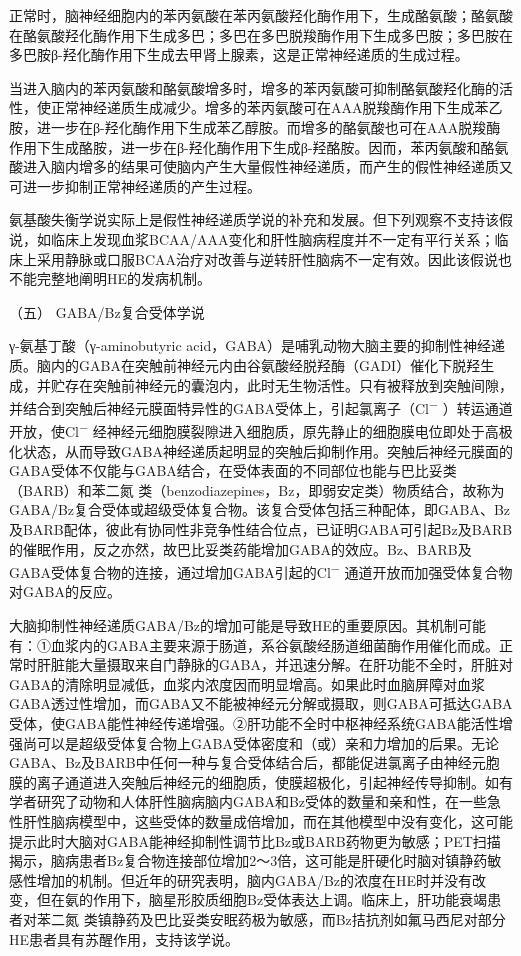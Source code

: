 正常时，脑神经细胞内的苯丙氨酸在苯丙氨酸羟化酶作用下，生成酪氨酸；酪氨酸在酪氨酸羟化酶作用下生成多巴；多巴在多巴脱羧酶作用下生成多巴胺；多巴胺在多巴胺β-羟化酶作用下生成去甲肾上腺素，这是正常神经递质的生成过程。

当进入脑内的苯丙氨酸和酪氨酸增多时，增多的苯丙氨酸可抑制酪氨酸羟化酶的活性，使正常神经递质生成减少。增多的苯丙氨酸可在AAA脱羧酶作用下生成苯乙胺，进一步在β-羟化酶作用下生成苯乙醇胺。而增多的酪氨酸也可在AAA脱羧酶作用下生成酪胺，进一步在β-羟化酶作用下生成β-羟酪胺。因而，苯丙氨酸和酪氨酸进入脑内增多的结果可使脑内产生大量假性神经递质，而产生的假性神经递质又可进一步抑制正常神经递质的产生过程。

氨基酸失衡学说实际上是假性神经递质学说的补充和发展。但下列观察不支持该假说，如临床上发现血浆BCAA/AAA变化和肝性脑病程度并不一定有平行关系；临床上采用静脉或口服BCAA治疗对改善与逆转肝性脑病不一定有效。因此该假说也不能完整地阐明HE的发病机制。

\hypertarget{text00101.htmlux5cux23CHP4-3-4-2-5}{}
（五） GABA/Bz复合受体学说

γ-氨基丁酸（γ-aminobutyric
acid，GABA）是哺乳动物大脑主要的抑制性神经递质。脑内的GABA在突触前神经元内由谷氨酸经脱羟酶（GADI）催化下脱羟生成，并贮存在突触前神经元的囊泡内，此时无生物活性。只有被释放到突触间隙，并结合到突触后神经元膜面特异性的GABA受体上，引起氯离子（Cl\textsuperscript{−}
）转运通道开放，使Cl\textsuperscript{−}
经神经元细胞膜裂隙进入细胞质，原先静止的细胞膜电位即处于高极化状态，从而导致GABA神经递质起明显的突触后抑制作用。突触后神经元膜面的GABA受体不仅能与GABA结合，在受体表面的不同部位也能与巴比妥类（BARB）和苯二氮{}
类（benzodiazepines，Bz，即弱安定类）物质结合，故称为GABA/Bz复合受体或超级受体复合物。该复合受体包括三种配体，即GABA、Bz及BARB配体，彼此有协同性非竞争性结合位点，已证明GABA可引起Bz及BARB的催眠作用，反之亦然，故巴比妥类药能增加GABA的效应。Bz、BARB及GABA受体复合物的连接，通过增加GABA引起的Cl\textsuperscript{−}
通道开放而加强受体复合物对GABA的反应。

大脑抑制性神经递质GABA/Bz的增加可能是导致HE的重要原因。其机制可能有：①血浆内的GABA主要来源于肠道，系谷氨酸经肠道细菌酶作用催化而成。正常时肝脏能大量摄取来自门静脉的GABA，并迅速分解。在肝功能不全时，肝脏对GABA的清除明显减低，血浆内浓度因而明显增高。如果此时血脑屏障对血浆GABA透过性增加，而GABA又不能被神经元分解或摄取，则GABA可抵达GABA受体，使GABA能性神经传递增强。②肝功能不全时中枢神经系统GABA能活性增强尚可以是超级受体复合物上GABA受体密度和（或）亲和力增加的后果。无论GABA、Bz及BARB中任何一种与复合受体结合后，都能促进氯离子由神经元胞膜的离子通道进入突触后神经元的细胞质，使膜超极化，引起神经传导抑制。如有学者研究了动物和人体肝性脑病脑内GABA和Bz受体的数量和亲和性，在一些急性肝性脑病模型中，这些受体的数量成倍增加，而在其他模型中没有变化，这可能提示此时大脑对GABA能神经抑制性调节比Bz或BARB药物更为敏感；PET扫描揭示，脑病患者Bz复合物连接部位增加2～3倍，这可能是肝硬化时脑对镇静药敏感性增加的机制。但近年的研究表明，脑内GABA/Bz的浓度在HE时并没有改变，但在氨的作用下，脑星形胶质细胞Bz受体表达上调。临床上，肝功能衰竭患者对苯二氮{}
类镇静药及巴比妥类安眠药极为敏感，而Bz拮抗剂如氟马西尼对部分HE患者具有苏醒作用，支持该学说。

